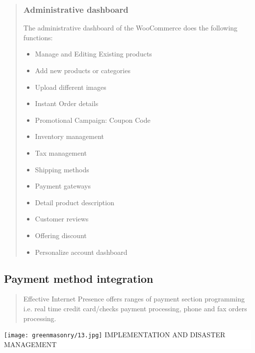 \documentclass[35pt]{report}
\begin{document}
\begin{quote}
					\subsubsection{Administrative dashboard}
					The administrative dashboard of the WooCommerce does the following functions:
					\begin{itemize}
						\item Manage and Editing Existing products
						\item Add new products or categories
						\item Upload different images
						\item Instant Order details
						\item Promotional Campaign: Coupon Code
						\item Inventory management
						\item Tax management
						\item Shipping methods
						\item Payment gateways
						\item Detail product description
						\item Customer reviews		
						\item Offering discount
						\item Personalize account dashboard
					\end{itemize}
			\end{quote}

			\subsection{Payment method integration}
			\begin{quote}
			Effective Internet Presence offers ranges of payment section programming i.e. real time credit card/checks payment processing, phone and fax orders processing. 
			\end{quote}

\clearpage


\thispagestyle{empty}

\vspace*{2cm}
\colorbox{white}{
	\parbox[t]{1.0\linewidth}{
       	\begin{center} 
			\fontsize{40pt}{11pt}\selectfont 
			\vspace*{.5cm}
				{\texttt{[image: greenmasonry/13.jpg]}}
				{IMPLEMENTATION AND DISASTER MANAGEMENT}
			\vspace*{.5cm}
		\end{center}
	}
}
\end{document}
